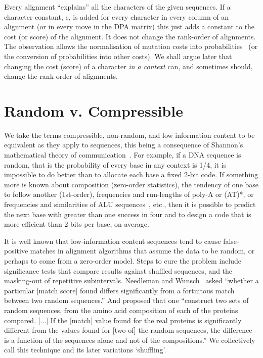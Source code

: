 \documentclass[letterpaper,11pt,oneside]{article}
\begin{document}
Every alignment ``explains'' all the characters of the given sequences.
If a character constant, c, is added for every character
in every column of an alignment (or in every move in the DPA matrix)
this just adds a constant to the cost (or score) of the alignment.
It does not change the rank-order of alignments.
The observation allows the normalisation of mutation costs into
probabilities~\cite{allison93a} (or the conversion of probabilities into other costs).
We shall argue later that changing the cost (score) of a character
{\em in a context} can, and sometimes should, change the rank-order
of alignments.


\section{Random v. Compressible}

We take the terms compressible, non-random, and low information content
to be equivalent as they apply to sequences, this being a consequence of
Shannon's mathematical theory of communication~\cite{shannon48}.
For example, if a DNA sequence is random, that is the probability of every
base in any context is 1/4, it is impossible to do better than to allocate
each base a fixed 2-bit code.
If something more is known about composition (zero-order statistics),
the tendency of one base to follow another (1st-order),
frequencies and run-lengths of poly-A or (AT)*, or
frequencies and similarities of ALU sequences~\cite{herzel94}, etc.,
then it is possible to predict the next base with greater than one success
in four and to design a code that is more efficient than 2-bits per base,
on average.

It is well known that low-information content sequences tend to cause
false-positive matches in alignment algorithms that assume
the data to be random, or perhaps to come from a zero-order model.
Steps to cure the problem include
significance tests that compare results against shuffled sequences, and
the masking-out of repetitive subintervals.
Needleman and Wunsch~\cite{needleman70}
asked ``whether a particular [match score] found differs significantly
from a fortuitous match between two random sequences.''
And proposed that one ``construct two sets of random sequences,
from the amino acid composition of each of the proteins compared. [...]
If the [match] value found for the real proteins is significantly different
from the values found for [two of] the random sequences,
the difference is a function of the sequences alone and
not of the compositions.''
We collectively call this technique and its later variations `shuffling'.
\end{document}
